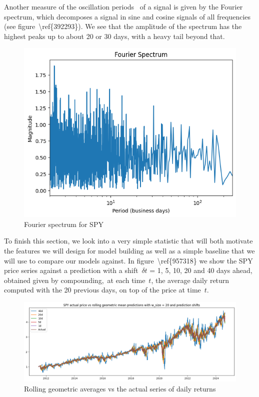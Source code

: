 \documentclass[10pt]{article}
\begin{document}
Another measure of the oscillation periods~ of a signal is given by the
Fourier spectrum, which decomposes a signal in sine and cosine signals
of all frequencies (see figure~{\textbackslash ref\{392293\}}). We see
that the amplitude of the spectrum has the highest peaks up to about 20
or 30 days, with a heavy tail beyond that.
\begin{figure}[H]
\begin{center}
\includegraphics[width=0.70\columnwidth]{figures/output9/output9}
\caption{{Fourier spectrum for SPY
{\label{392293}}%
}}
\end{center}
\end{figure}

To finish this section, we look into a very simple statistic that will
both motivate the features we will design for model building as well as
a simple baseline that we will use to compare our models against. In
figure~{\textbackslash ref\{957318\}} we show the SPY price series
against a prediction with a shift~\(\delta t\) = 1, 5, 10, 20 and
40 days ahead, obtained given by compounding,~at each
time~\(t\), the average daily return computed with the 20
previous days, on top of the price at time~\(t\).
\begin{figure}[H]
\begin{center}
\includegraphics[width=0.98\columnwidth]{figures/output10/output10}
\caption{{Rolling geometric averages vs the actual series of daily returns
{\label{957318}}%
}}
\end{center}
\end{figure}
\end{document}

